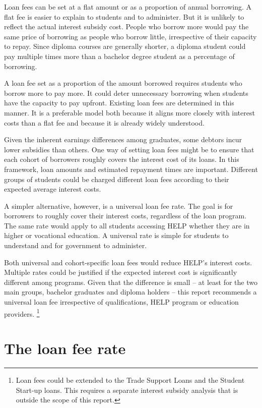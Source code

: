 \documentclass[embargoed]{grattan}
\begin{document}
{Loan fees can be set at a flat amount or as a proportion of annual borrowing.
A flat fee is easier to explain to students and to administer.
But it is unlikely to reflect the actual interest subsidy cost.
People who borrow more would pay the same price of borrowing as people who borrow little, irrespective of their capacity to repay.
Since diploma courses are generally shorter, a diploma student could pay multiple times more than a bachelor degree student as a percentage of borrowing.

A loan fee set as a proportion of the amount borrowed requires students who borrow more to pay more.
It could deter unnecessary borrowing when students have the capacity to pay upfront.
Existing loan fees are determined in this manner.
It is a preferable model both because it aligns more closely with interest costs than a flat fee and because it is already widely understood.

Given the inherent earnings differences among graduates, some debtors incur lower subsidies than others.
One way of setting loan fees might be to ensure that each cohort of borrowers roughly covers the interest cost of its loans.
In this framework, loan amounts and estimated repayment times are important.
Different groups of students could be charged different loan fees according to their expected average interest costs.

A simpler alternative, however, is a universal loan fee rate.
The goal is for borrowers to roughly cover their interest costs, regardless of the loan program.
The same rate would apply to all students accessing \gls{HELP} whether they are in higher or vocational education.
A universal rate is simple for students to understand and for government to administer.

Both universal and cohort-specific loan fees would reduce \gls{HELP}'s interest costs.
Multiple rates could be justified if the expected interest cost is significantly different among programs.
Given that the difference is small -- at least for the two main groups, bachelor graduates and diploma holders -- this report recommends a universal loan fee irrespective of qualifications, \gls{HELP} program or education providers.%
\footnote{Loan fees could be extended to the Trade Support Loans and the Student Start-up loans.
This requires a separate interest subsidy analysis that is outside the scope of this report.}

\section{The loan fee rate}\label{sec:the-loan-fee-rate}

}
\end{document}
